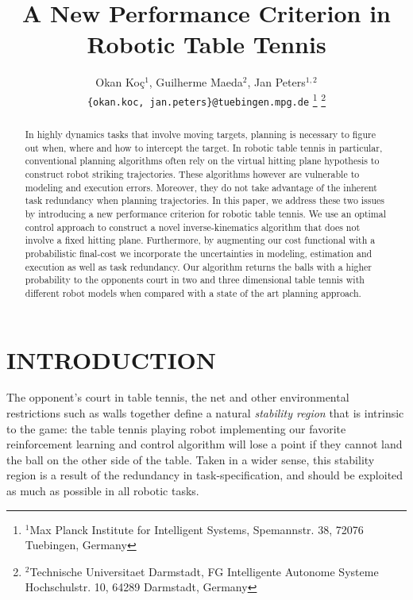 \documentclass[letterpaper, 10 pt, conference]{ieeeconf}
\author{Okan Ko\c c$^{1}$, Guilherme Maeda$^{2}$, Jan Peters$^{1,2}$%
\\
{\tt\small \{okan.koc, jan.peters\}@tuebingen.mpg.de}%
\thanks{$^{1}$Max Planck Institute for Intelligent Systems,
        Spemannstr. 38, 72076 Tuebingen, Germany}
\thanks{$^{2}$Technische Universitaet Darmstadt, FG Intelligente Autonome Systeme
        Hochschulstr. 10, 64289 Darmstadt, Germany}
}
\title{A New Performance Criterion in Robotic Table Tennis}
\newcommand{\court}{\mathcal{T}} %
\begin{document}
\maketitle
\thispagestyle{empty}
\pagestyle{empty}

\begin{abstract}

In highly dynamics tasks that involve moving targets, planning is necessary to figure out when, where and how to intercept the target. In robotic table tennis in particular, conventional planning algorithms often rely on the virtual hitting plane hypothesis to construct robot striking trajectories. These algorithms however are vulnerable to modeling and execution errors. %
Moreover, they do not take advantage of the inherent task redundancy when planning trajectories. In this paper, we address these two issues by introducing a new performance criterion for robotic table tennis. We use an optimal control approach to construct a novel inverse-kinematics algorithm that does not involve a fixed hitting plane. Furthermore, by augmenting our cost functional with a probabilistic final-cost we incorporate the uncertainties in modeling, estimation and execution as well as task redundancy. Our algorithm returns the balls with a higher probability to the opponents court in two and three dimensional table tennis with different robot models when compared with a state of the art planning approach. 



\end{abstract}


%
%
%
%

\section{INTRODUCTION}

The opponent's court in table tennis, the net and other environmental restrictions such as walls together define a natural \emph{stability region} that is intrinsic to the game: the table tennis playing robot implementing our favorite reinforcement learning and control algorithm will lose a point if they cannot land the ball on the other side of the table. Taken in a wider sense, this stability region is a result of the redundancy in task-specification, and should be exploited as much as possible in all robotic tasks. 
\end{document}
